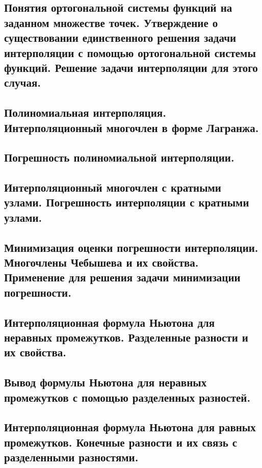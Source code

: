 \documentclass[14pt]{extarticle}
\begin{document}
\clearpage
\subsection{Понятия ортогональной системы функций на заданном множестве точек. Утверждение о существовании единственного решения задачи интерполяции с помощью ортогональной системы функций. Решение задачи интерполяции для этого случая.}

\clearpage
\subsection{Полиномиальная интерполяция. Интерполяционный многочлен в форме Лагранжа.}

\clearpage
\subsection{Погрешность полиномиальной интерполяции.}

\clearpage
\subsection{Интерполяционный многочлен с кратными узлами. Погрешность интерполяции с кратными узлами.}

\clearpage
\subsection{Минимизация оценки погрешности интерполяции. Многочлены Чебышева и их свойства. Применение для решения задачи минимизации погрешности.}

\clearpage
\subsection{Интерполяционная формула Ньютона для неравных промежутков. Разделенные разности и их свойства.}

\clearpage
\subsection{Вывод формулы Ньютона для неравных промежутков с помощью разделенных разностей.}

\clearpage
\subsection{Интерполяционная формула Ньютона для равных промежутков. Конечные разности и их связь с разделенными разностями.}
\end{document}
